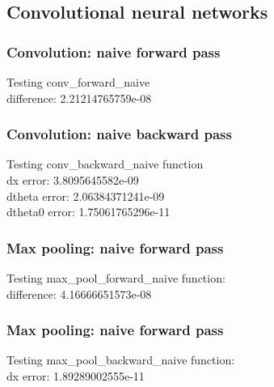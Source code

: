 \documentclass{article}
\begin{document}
\subsection{Convolutional neural networks}

\subsubsection{Convolution: naive forward pass}
{\footnotesize
Testing conv\_forward\_naive\\
difference:  2.21214765759e-08\\
}

\subsubsection{Convolution: naive backward pass}
{\footnotesize
Testing conv\_backward\_naive function\\
dx error:  3.8095645582e-09\\
dtheta error:  2.06384371241e-09\\
dtheta0 error:  1.75061765296e-11\\
}

\subsubsection{Max pooling: naive forward pass}
{\footnotesize
Testing max\_pool\_forward\_naive function:\\
difference:  4.16666651573e-08\\
}

\subsubsection{Max pooling: naive forward pass}
{\footnotesize
Testing max\_pool\_backward\_naive function:\\
dx error:  1.89289002555e-11\\
}
\end{document}
